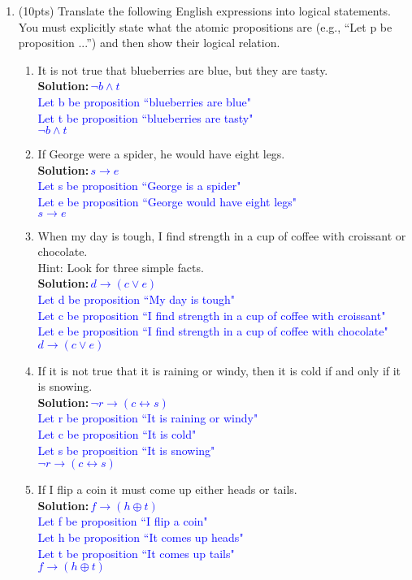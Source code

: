 \documentclass{article}
\renewcommand{\implies}{\rightarrow}
\newcommand{\xor}{\oplus}
\newcommand{\sol}[1]{\textbf{Solution:\,}\textcolor{blue}{#1}}
\begin{document}
\begin{enumerate}
\newpage

\item(10pts) Translate the following English expressions into logical statements. You must explicitly state what the atomic propositions are (e.g., ``Let p be proposition ...'') and then show their logical relation.

\begin{enumerate}
\item It is not true that blueberries are blue, but they are tasty.
\\\sol{$\neg b \land t$
\\Let b be proposition ``blueberries are blue"
\\Let t be proposition ``blueberries are tasty"
\\$\neg b \land t$ 
}
\item If George were a spider, he would have eight legs.
\\\sol{$s\implies e$
\\Let s be proposition ``George is a spider"
\\Let e be proposition ``George would have eight legs"
\\$s\implies e$
}
\item When my day is tough, I find strength in a cup of coffee with croissant or chocolate.\\
Hint: Look for three simple facts.
\\\sol{$d \implies (c \lor e)$
\\Let d be proposition ``My day is tough"
\\Let c be proposition ``I find strength in a cup of coffee with croissant"
\\Let e be proposition ``I find strength in a cup of coffee with chocolate"
\\$d \implies (c \lor e)$
}
\item If it is not true that it is raining or windy, then it is cold if and only if it is snowing. 
\\\sol{$\neg r \implies (c \leftrightarrow s)$
\\Let r be proposition ``It is raining or windy"
\\Let c be proposition ``It is cold"
\\Let s be proposition ``It is snowing"
\\$\neg r \implies (c \leftrightarrow s)$
}
\item If I flip a coin it must come up either heads or tails.
\\\sol{$f\implies(h\xor t)$
\\Let f be proposition ``I flip a coin"
\\Let h be proposition ``It comes up heads"
\\Let t be proposition ``It comes up tails"
\\$f\implies(h\xor t)$
}
\end{enumerate}


\end{enumerate}
\end{document}
